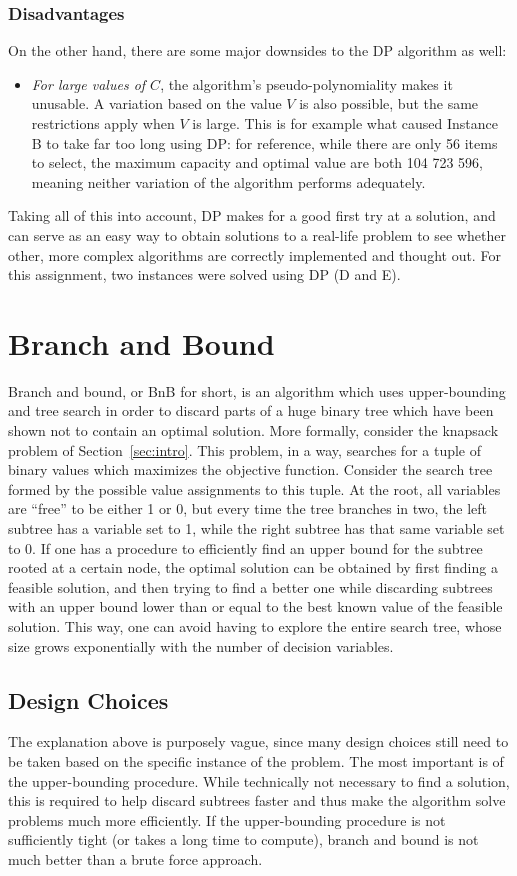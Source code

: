 \documentclass[journal]{IEEEtran}
\begin{document}
\subsubsection{Disadvantages}
On the other hand, there are some major downsides to the DP algorithm as well:
\begin{itemize}
	\item \emph{For large values of \(C\)}, the algorithm's pseudo-polynomiality makes it unusable.
	A variation based on the value \(V\) is also possible, but the same restrictions apply when \(V\) is large.
	This is for example what caused Instance B to take far too long using DP: for reference, while there are only 56 items to select, the maximum capacity and optimal value are both 104 723 596, meaning neither variation of the algorithm performs adequately.
\end{itemize}
Taking all of this into account, DP makes for a good first try at a solution, and can serve as an easy way to obtain solutions to a real-life problem to see whether other, more complex algorithms are correctly implemented and thought out.
For this assignment, two instances were solved using DP (D and E).

\section{Branch and Bound}
Branch and bound, or BnB for short, is an algorithm which uses upper-bounding and tree search in order to discard parts of a huge binary tree which have been shown not to contain an optimal solution.
More formally, consider the knapsack problem of Section~\ref{sec:intro}.
This problem, in a way, searches for a tuple of binary values which maximizes the objective function.
Consider the search tree formed by the possible value assignments to this tuple.
At the root, all variables are ``free'' to be either 1 or 0, but every time the tree branches in two, the left subtree has a variable set to 1, while the right subtree has that same variable set to 0.
If one has a procedure to efficiently find an upper bound for the subtree rooted at a certain node, the optimal solution can be obtained by first finding a feasible solution, and then trying to find a better one while discarding subtrees with an upper bound lower than or equal to the best known value of the feasible solution.
This way, one can avoid having to explore the entire search tree, whose size grows exponentially with the number of decision variables.

\subsection{Design Choices}
The explanation above is purposely vague, since many design choices still need to be taken based on the specific instance of the problem.
The most important is of the upper-bounding procedure.
While technically not necessary to find a solution, this is required to help discard subtrees faster and thus make the algorithm solve problems much more efficiently.
If the upper-bounding procedure is not sufficiently tight (or takes a long time to compute), branch and bound is not much better than a brute force approach.
\end{document}
